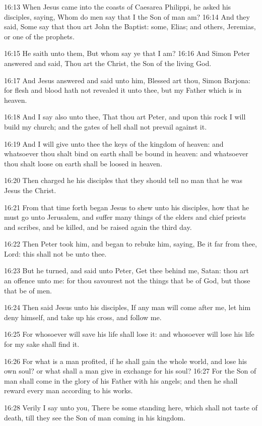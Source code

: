 16:13 When Jesus came into the coasts of Caesarea Philippi, he asked
his disciples, saying, Whom do men say that I the Son of man am?
16:14 And they said, Some say that thou art John the Baptist: some,
Elias; and others, Jeremias, or one of the prophets.

16:15 He saith unto them, But whom say ye that I am?  16:16 And Simon
Peter answered and said, Thou art the Christ, the Son of the living
God.

16:17 And Jesus answered and said unto him, Blessed art thou, Simon
Barjona: for flesh and blood hath not revealed it unto thee, but my
Father which is in heaven.

16:18 And I say also unto thee, That thou art Peter, and upon this
rock I will build my church; and the gates of hell shall not prevail
against it.

16:19 And I will give unto thee the keys of the kingdom of heaven: and
whatsoever thou shalt bind on earth shall be bound in heaven: and
whatsoever thou shalt loose on earth shall be loosed in heaven.

16:20 Then charged he his disciples that they should tell no man that
he was Jesus the Christ.

16:21 From that time forth began Jesus to shew unto his disciples, how
that he must go unto Jerusalem, and suffer many things of the elders
and chief priests and scribes, and be killed, and be raised again the
third day.

16:22 Then Peter took him, and began to rebuke him, saying, Be it far
from thee, Lord: this shall not be unto thee.

16:23 But he turned, and said unto Peter, Get thee behind me, Satan:
thou art an offence unto me: for thou savourest not the things that be
of God, but those that be of men.

16:24 Then said Jesus unto his disciples, If any man will come after
me, let him deny himself, and take up his cross, and follow me.

16:25 For whosoever will save his life shall lose it: and whosoever
will lose his life for my sake shall find it.

16:26 For what is a man profited, if he shall gain the whole world,
and lose his own soul? or what shall a man give in exchange for his
soul?  16:27 For the Son of man shall come in the glory of his Father
with his angels; and then he shall reward every man according to his
works.

16:28 Verily I say unto you, There be some standing here, which shall
not taste of death, till they see the Son of man coming in his
kingdom.

